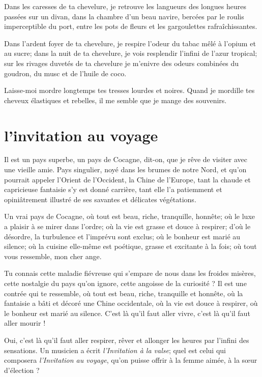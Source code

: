 Dans les caresses de ta chevelure, je retrouve les langueurs des longues
heures passées sur un divan, dans la chambre d’un beau
navire, bercées par le roulis imperceptible du port, entre les pots de
fleurs et les gargoulettes rafraîchissantes.

Dans l’ardent foyer de ta chevelure, je respire
l’odeur du tabac mêlé à l’opium et au
sucre; dans la nuit de ta chevelure, je vois resplendir
l’infini de l’azur tropical; sur les
rivages duvetés de ta chevelure je m’enivre des odeurs
combinées du goudron, du musc et de l’huile de coco.

Laisse{}-moi mordre longtemps tes tresses lourdes et noires. Quand je
mordille tes cheveux élastiques et rebelles, il me semble que je mange
des souvenirs.
\ \\

\quebra\section[L’invitation au voyage]{l’invitation au voyage}

Il est un pays superbe, un pays de Cocagne, dit{}-on, que je rêve de
visiter avec une vieille amie. Pays singulier, noyé dans les brumes de
notre Nord, et qu’on pourrait appeler
l’Orient de l’Occident, la Chine de
l’Europe, tant la chaude et capricieuse fantaisie
s’y est donné carrière, tant elle l’a
patiemment et opiniâtrement illustré de ses savantes et délicates
végétations.

Un vrai pays de Cocagne, où tout est beau, riche, tranquille, honnête;
où le luxe a plaisir à se mirer dans l’ordre; où la
vie est grasse et douce à respirer; d’où le désordre,
la turbulence et l’imprévu sont exclus; où le bonheur
est marié au silence; où la cuisine elle{}-même est poétique, grasse et
excitante à la fois; où tout vous ressemble, mon cher ange.

Tu connais cette maladie fiévreuse qui s’empare de nous
dans les froides misères, cette nostalgie du pays
qu’on ignore, cette angoisse de la curiosité ? Il est
une contrée qui te ressemble, où tout est beau, riche, tranquille et
honnête, où la fantaisie a bâti et décoré une Chine occidentale, où la
vie est douce à respirer, où le bonheur est marié au silence.
C’est là qu’il faut aller vivre,
c’est là qu’il faut aller mourir !

Oui, c’est là qu’il faut aller
respirer, rêver et allonger les heures par l’infini
des sensations. Un musicien a écrit \textit{l’Invitation à la
valse}; quel est celui qui composera \textit{l’Invitation au
voyage}, qu’on puisse offrir à la femme aimée, à la
s\oe ur d’élection ?

